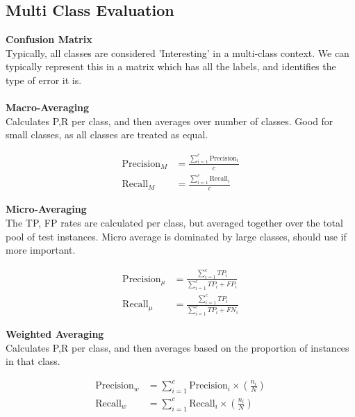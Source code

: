\documentclass[a4paper,10pt]{article}
\begin{document}
\subsection*{Multi Class Evaluation}
\textcolor{Periwinkle}{\textbf{Confusion Matrix}}\\
Typically, all classes are considered 'Interesting' in a multi-class context. We can typically represent this in a matrix which has all the labels, and identifies the type of error it is. \\\\ 
\textcolor{Periwinkle}{\textbf{Macro-Averaging}}\\
Calculates P,R per class, and then averages over number of classes. Good for small classes, as all classes are treated as equal. 
\begin{shaded}
	\begin{align*}
		\text{Precision}_{M} &= \frac{\sum_{i=1}^{c} \text{Precision}_{i}}{c} \\
		\text{Recall}_{M} &= \frac{\sum_{i=1}^{c} \text{Recall}_{i}}{c}
	\end{align*}
\end{shaded}
\noindent \textcolor{Periwinkle}{\textbf{Micro-Averaging}}\\
The TP, FP rates are calculated per class, but averaged together over the total pool of test instances. Micro average is dominated by large classes, should use if more important. 
\begin{shaded}
	\begin{align*}
		\text{Precision}_{\mu} &= \frac{\sum_{i=1}^{c} TP_{i}}{\sum_{i=1}^{c} TP_{i} + FP_{i}} \\
		\text{Recall}_{\mu} &= \frac{\sum_{i=1}^{c} TP_{i}}{\sum_{i=1}^{c} TP_{i} + FN_{i}}
	\end{align*}
\end{shaded}
\noindent \textcolor{Periwinkle}{\textbf{Weighted Averaging}}\\
Calculates P,R per class, and then averages based on the proportion of instances in that class. 
\begin{shaded}
	\begin{align*}
		\text{Precision}_{w} &= \sum_{i = 1}^{c}\text{Precision}_{i} \times (\frac{n_{i}}{N}) \\
		\text{Recall}_{w} &= \sum_{i = 1}^{c}\text{Recall}_{i} \times (\frac{n_{i}}{N}) 
	\end{align*}
\end{shaded}
\newpage
\end{document}
